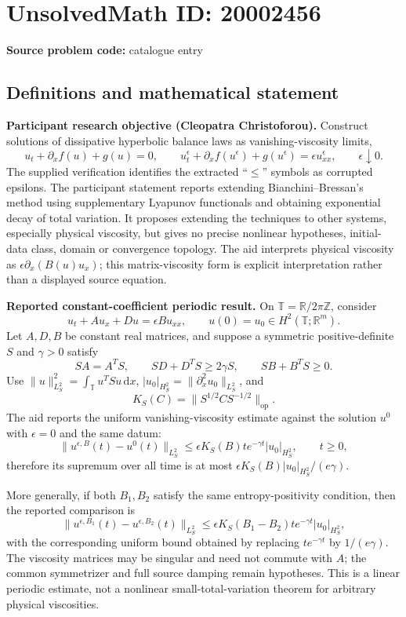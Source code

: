 \documentclass[11pt]{article}
\newcommand{\Z}{\mathbb{Z}}
\newcommand{\R}{\mathbb{R}}
\begin{document}
\section*{UnsolvedMath ID: 20002456}
\textbf{Source problem code:} catalogue entry
\subsection{Definitions and mathematical statement}
\textbf{Participant research objective (Cleopatra Christoforou).} Construct solutions of dissipative hyperbolic balance laws as vanishing-viscosity limits,
\[
 u_t+\partial_xf(u)+g(u)=0,\qquad
 u_t^\epsilon+\partial_xf(u^\epsilon)+g(u^\epsilon)
 =\epsilon u_{xx}^\epsilon,\qquad\epsilon\downarrow0.
\]
The supplied verification identifies the extracted ``\(\leq\)'' symbols as corrupted epsilons. The participant statement reports extending Bianchini--Bressan's method using supplementary Lyapunov functionals and obtaining exponential decay of total variation. It proposes extending the techniques to other systems, especially physical viscosity, but gives no precise nonlinear hypotheses, initial-data class, domain or convergence topology. The aid interprets physical viscosity as \(\epsilon\partial_x(B(u)u_x)\); this matrix-viscosity form is explicit interpretation rather than a displayed source equation.

\textbf{Reported constant-coefficient periodic result.} On \(\mathbb T=\R/2\pi\Z\), consider
\[
 u_t+A u_x+D u=\epsilon B u_{xx},\qquad u(0)=u_0\in H^2(\mathbb T;\R^m).
\]
Let \(A,D,B\) be constant real matrices, and suppose a symmetric positive-definite \(S\) and \(\gamma>0\) satisfy
\[
 SA=A^TS,\qquad SD+D^TS\geq2\gamma S,\qquad
 SB+B^TS\geq0.
\]
Use \(\|u\|_{L^2_S}^2=\int_{\mathbb T}u^TSu\,\mathrm dx\),
\( |u_0|_{H^2_S}=\|\partial_x^2u_0\|_{L^2_S}\), and
\[
 K_S(C)=\|S^{1/2}CS^{-1/2}\|_{\mathrm{op}}.
\]
The aid reports the uniform vanishing-viscosity estimate against the solution \(u^0\) with \(\epsilon=0\) and the same datum:
\[
 \|u^{\epsilon,B}(t)-u^0(t)\|_{L^2_S}
 \leq\epsilon K_S(B)t e^{-\gamma t}|u_0|_{H^2_S},
 \qquad t\geq0,
\]
therefore its supremum over all time is at most
\(\epsilon K_S(B)|u_0|_{H^2_S}/(e\gamma)\).

More generally, if both \(B_1,B_2\) satisfy the same entropy-positivity condition, then the reported comparison is
\[
 \|u^{\epsilon,B_1}(t)-u^{\epsilon,B_2}(t)\|_{L^2_S}
 \leq\epsilon K_S(B_1-B_2)t e^{-\gamma t}|u_0|_{H^2_S},
\]
with the corresponding uniform bound obtained by replacing \(te^{-\gamma t}\) by \(1/(e\gamma)\). The viscosity matrices may be singular and need not commute with \(A\); the common symmetrizer and full source damping remain hypotheses. This is a linear periodic estimate, not a nonlinear small-total-variation theorem for arbitrary physical viscosities.
\end{document}
